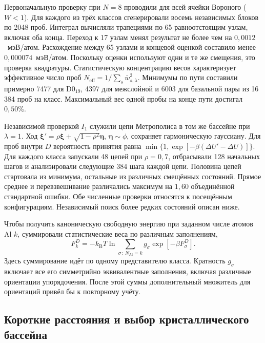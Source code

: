 \documentclass[11pt,a4paper]{article}
\begin{document}
Первоначальную проверку при $N=8$ проводили для всей ячейки Вороного
($W<1$). Для каждого из трёх классов сгенерировали восемь независимых
блоков по 2048 проб. Интеграл вычисляли трапециями по 65 равноотстоящим
узлам, включая оба конца. Переход к 17 узлам менял результат не более чем
на $0{,}0012$~мэВ/атом. Расхождение между 65 узлами и концевой оценкой
составило менее $0{,}000074$~мэВ/атом. Поскольку оценки используют одни и
те же смещения, это проверка квадратуры. Статистическую концентрацию весов
характеризует эффективное число проб $N_{\mathrm{eff}}=1/\sum_s\bar
w_{s,\lambda}^2$. Минимумы по пути составили примерно 7477 для
D0$_{19}$, 4397 для межслойной и 6003 для базальной пары из 16\,384 проб на
класс. Максимальный вес одной пробы на конце пути достигал $0{,}50\%$.

Независимой проверкой $I_1$ служили цепи Метрополиса в том же бассейне при
$\lambda=1$. Ход $\boldsymbol\xi'=\rho\boldsymbol\xi+
\sqrt{1-\rho^2}\boldsymbol\eta$, $\boldsymbol\eta\sim\phi$, сохраняет
гармоническую гауссиану. Для проб внутри $D$ вероятность принятия равна
$\min\{1,\exp[-\beta(\Delta U'-\Delta U)]\}$. Для каждого класса запускали
48 цепей при $\rho=0{,}7$, отбрасывали 128 начальных шагов и анализировали
следующие 384 шага каждой цепи. Половина цепей стартовала из минимума,
остальные из различных смещённых состояний. Прямое среднее
и перевзвешивание различались максимум на $1{,}60$ объединённой
стандартной ошибки. Обе численные проверки относятся к посещённым
конфигурациям. Независимый поиск более редких состояний описан ниже.

Чтобы получить каноническую свободную энергию при заданном числе атомов Al
$k$, суммировали статистические веса по различным заполнениям,
\begin{equation}
 F_k^D=-k_{\mathrm B}T\ln
   \sum_{\sigma\,:\,N_{\mathrm{Al}}=k}g_\sigma
     \exp[-\beta F_\sigma^D] .
\end{equation}
Здесь суммирование идёт по одному представителю класса. Кратность
$g_\sigma$ включает все его симметрийно эквивалентные заполнения,
включая различные ориентации упорядочения. После этой суммы дополнительный
множитель для ориентаций привёл бы к повторному учёту.

\subsection{Короткие расстояния и выбор кристаллического бассейна}
\end{document}
